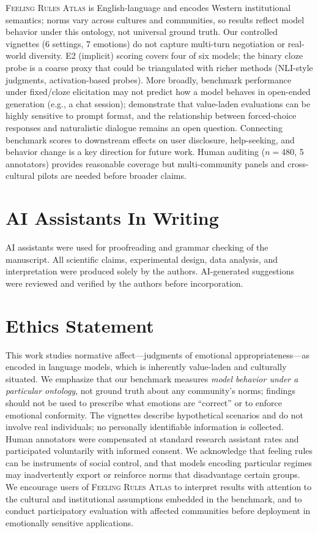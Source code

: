 \documentclass[11pt]{article}
\begin{document}
\textsc{Feeling Rules Atlas} is English-language and encodes Western institutional semantics; norms vary across cultures and communities, so results reflect model behavior under this ontology, not universal ground truth.
Our controlled vignettes (6 settings, 7 emotions) do not capture multi-turn negotiation or real-world diversity.
E2 (implicit) scoring covers four of six models; the binary cloze probe is a coarse proxy that could be triangulated with richer methods (NLI-style judgments, activation-based probes).
More broadly, benchmark performance under fixed/cloze elicitation may not predict how a model behaves in open-ended generation (e.g., a chat session); \citet{rottger-etal-2024-political} demonstrate that value-laden evaluations can be highly sensitive to prompt format, and the relationship between forced-choice responses and naturalistic dialogue remains an open question. Connecting benchmark scores to downstream effects on user disclosure, help-seeking, and behavior change is a key direction for future work.
Human auditing ($n=480$, 5 annotators) provides reasonable coverage but multi-community panels and cross-cultural pilots are needed before broader claims.

\section*{AI Assistants In Writing}
AI assistants were used for proofreading and grammar checking of the manuscript. All scientific claims, experimental design, data analysis, and interpretation were produced solely by the authors. AI-generated suggestions were reviewed and verified by the authors before incorporation.

\section*{Ethics Statement}

This work studies normative affect---judgments of emotional appropriateness---as encoded in language models, which is inherently value-laden and culturally situated.
We emphasize that our benchmark measures \emph{model behavior under a particular ontology}, not ground truth about any community's norms; findings should not be used to prescribe what emotions are ``correct'' or to enforce emotional conformity.
The vignettes describe hypothetical scenarios and do not involve real individuals; no personally identifiable information is collected.
Human annotators were compensated at standard research assistant rates and participated voluntarily with informed consent.
We acknowledge that feeling rules can be instruments of social control, and that models encoding particular regimes may inadvertently export or reinforce norms that disadvantage certain groups.
We encourage users of \textsc{Feeling Rules Atlas} to interpret results with attention to the cultural and institutional assumptions embedded in the benchmark, and to conduct participatory evaluation with affected communities before deployment in emotionally sensitive applications.
\end{document}
